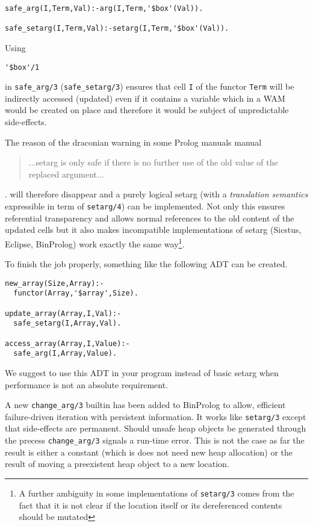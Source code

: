 \documentclass{article}
\begin{document}
\begin{verbatim}
safe_arg(I,Term,Val):-arg(I,Term,'$box'(Val)).

safe_setarg(I,Term,Val):-setarg(I,Term,'$box'(Val)).
\end{verbatim}

Using 
\begin{verbatim}
'$box'/1
\end{verbatim}
in {\tt safe\_arg/3} ({\tt safe\_setarg/3})
ensures that cell {\tt I} of the functor {\tt Term}
will be indirectly accessed (updated) even if it contains a variable
which in a WAM would be created  on place and therefore
it would be subject of unpredictable side-effects.

The reason of the draconian warning in some Prolog manuals
manual
\begin{quote}
...setarg is only safe if there is no further use
of the old value of the replaced argument...
\end{quote}.
will therefore disappear and a purely logical setarg
(with a {\em translation semantics} expressible in
term of {\tt setarg/4}) can be implemented.
Not only this ensures referential transparency
and allows normal
references to the old content of the updated
cells but it also makes incompatible implementations
of setarg (Sicstus, Eclipse, BinProlog) work exactly
the same way\footnote{A further ambiguity in some
implementations of {\tt setarg/3} comes from the fact
that it is not clear if the location itself or its
dereferenced contents should be mutated}.

To finish the job properly, something like the following ADT
can be created.

\begin{verbatim}
new_array(Size,Array):-
  functor(Array,'$array',Size).

update_array(Array,I,Val):-
  safe_setarg(I,Array,Val).

access_array(Array,I,Value):-
  safe_arg(I,Array,Value).
\end{verbatim}

We suggest to use this ADT in your program instead of basic setarg
when performance is not an absolute requirement.

A new {\tt change\_arg/3} builtin has been added to BinProlog to allow,
efficient failure-driven iteration with persistent information.
It works like {\tt setarg/3} except that side-effects are permanent.
Should unsafe heap objects be generated through the precess
{\tt change\_arg/3} signals a run-time error. This is not the case
as far the result is either a constant (which is does not need
new heap allocation) or the result of moving a preexistent
heap object to a new location.
\end{document}
